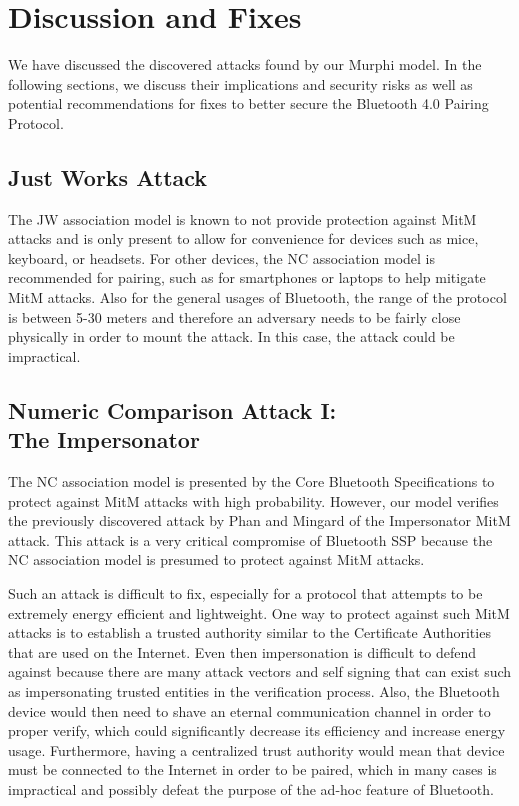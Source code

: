 \documentclass{acm_proc_article-sp}
\begin{document}
\section{Discussion and Fixes}
We have discussed the discovered attacks found by our Murphi model. In the following sections, we discuss their implications and security risks as well as potential recommendations for fixes to better secure the Bluetooth 4.0 Pairing Protocol.

\subsection{Just Works Attack}
The JW association model is known to not provide protection against MitM attacks and is only present to allow for convenience for devices such as mice, keyboard, or headsets. For other devices, the NC association model is recommended for pairing, such as for smartphones or laptops to help mitigate MitM attacks. Also for the general usages of Bluetooth, the range of the protocol is between 5-30 meters and therefore an adversary needs to be fairly close physically in order to mount the attack. In this case, the attack could be impractical.

\subsection{Numeric Comparison Attack I:\\The Impersonator}
The NC association model is presented by the Core Bluetooth Specifications \cite{bluetooth:sig4} to protect against MitM attacks with high probability. However, our model verifies the previously discovered attack by Phan and Mingard \cite{phan:mingard} of the Impersonator MitM attack. This attack is a very critical compromise of Bluetooth SSP because the NC association model is presumed to protect against MitM attacks.

Such an attack is difficult to fix, especially for a protocol that attempts to be extremely energy efficient and lightweight. One way to protect against such MitM attacks is to establish a trusted authority similar to the Certificate Authorities that are used on the Internet. Even then impersonation is difficult to defend against because there are many attack vectors and self signing that can exist such as impersonating trusted entities in the verification process. Also, the Bluetooth device would then need to shave an eternal communication channel in order to proper verify, which could significantly decrease its efficiency and increase energy usage. Furthermore, having a centralized trust authority would mean that device must be connected to the Internet in order to be paired, which in many cases is impractical and possibly defeat the purpose of the ad-hoc feature of Bluetooth.
\end{document}
